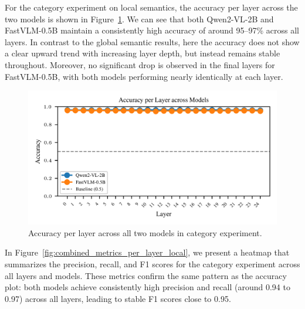 \documentclass[11pt]{article}
\begin{document}
For the category experiment on local semantics, the accuracy per layer across the two models is shown in Figure~\ref{fig:accuracy_per_layer_local}.
We can see that both Qwen2-VL-2B and FastVLM-0.5B maintain a consistently high accuracy of around 95--97\% across all layers.
In contrast to the global semantic results, here the accuracy does not show a clear upward trend with increasing layer depth, but instead remains stable throughout.
Moreover, no significant drop is observed in the final layers for FastVLM-0.5B, with both models performing nearly identically at each layer.

\begin{figure}[H]
    \centering
    \includegraphics[width=1\linewidth]{figures/local/_combined_exp2/accuracy_lines_per_layer.png}
    \caption{Accuracy per layer across all two models in category experiment.}
    \label{fig:accuracy_per_layer_local}
\end{figure}

In Figure~\ref{fig:combined_metrics_per_layer_local}, we present a heatmap that summarizes the precision, recall, and F1 scores for the category experiment across all layers and models.
These metrics confirm the same pattern as the accuracy plot: both models achieve consistently high precision and recall (around 0.94 to 0.97) across all layers, leading to stable F1 scores close to 0.95.
\end{document}
